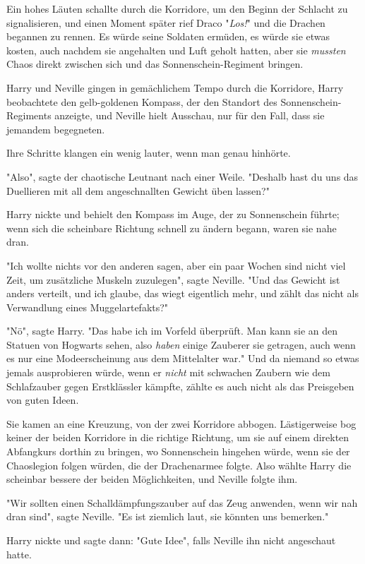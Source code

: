 {Ein hohes Läuten schallte durch die Korridore, um den Beginn der Schlacht zu signalisieren, und einen Moment später rief Draco "\emph{Los!}" und die Drachen begannen zu rennen. Es würde seine Soldaten ermüden, es würde sie etwas kosten, auch nachdem sie angehalten und Luft geholt hatten, aber sie \emph{mussten} Chaos direkt zwischen sich und das Sonnenschein-Regiment bringen.

Harry und Neville gingen in gemächlichem Tempo durch die Korridore, Harry beobachtete den gelb-goldenen Kompass, der den Standort des Sonnenschein-Regiments anzeigte, und Neville hielt Ausschau, nur für den Fall, dass sie jemandem begegneten.

Ihre Schritte klangen ein wenig lauter, wenn man genau hinhörte.

"Also", sagte der chaotische Leutnant nach einer Weile. "Deshalb hast du uns das Duellieren mit all dem angeschnallten Gewicht üben lassen?"

Harry nickte und behielt den Kompass im Auge, der zu Sonnenschein führte; wenn sich die scheinbare Richtung schnell zu ändern begann, waren sie nahe dran.

"Ich wollte nichts vor den anderen sagen, aber ein paar Wochen sind nicht viel Zeit, um zusätzliche Muskeln zuzulegen", sagte Neville. "Und das Gewicht ist anders verteilt, und ich glaube, das wiegt eigentlich mehr, und zählt das nicht als Verwandlung eines Muggelartefakts?"

"Nö", sagte Harry. "Das habe ich im Vorfeld überprüft. Man kann sie an den Statuen von Hogwarts sehen, also \emph{haben} einige Zauberer sie getragen, auch wenn es nur eine Modeerscheinung aus dem Mittelalter war." Und da niemand so etwas jemals ausprobieren würde, wenn er \emph{nicht} mit schwachen Zaubern wie dem Schlafzauber gegen Erstklässler kämpfte, zählte es auch nicht als das Preisgeben von guten Ideen.

Sie kamen an eine Kreuzung, von der zwei Korridore abbogen. Lästigerweise bog keiner der beiden Korridore in die richtige Richtung, um sie auf einem direkten Abfangkurs dorthin zu bringen, wo Sonnenschein hingehen würde, wenn sie der Chaoslegion folgen würden, die der Drachenarmee folgte. Also wählte Harry die scheinbar bessere der beiden Möglichkeiten, und Neville folgte ihm.

"Wir sollten einen Schalldämpfungszauber auf das Zeug anwenden, wenn wir nah dran sind", sagte Neville. "Es ist ziemlich laut, sie könnten uns bemerken."

Harry nickte und sagte dann: "Gute Idee", falls Neville ihn nicht angeschaut hatte.

}
